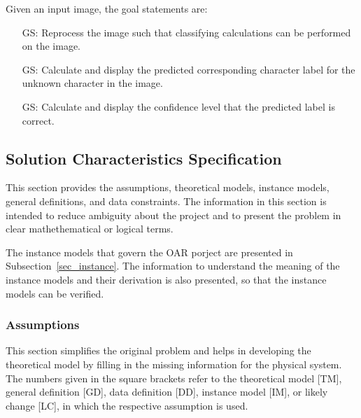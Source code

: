 \documentclass[12pt]{article}
\newcounter{goalnum} %
\begin{document}
\noindent Given an input image, the goal statements are:

\begin{itemize}

\item[GS\refstepcounter{goalnum}\thegoalnum \label{GS1}:] Reprocess the image such that classifying
calculations can be performed on the image.

\item[GS\refstepcounter{goalnum}\thegoalnum \label{GS2}:] Calculate and display the predicted 
corresponding character label for the unknown character in the image.

 \item[GS\refstepcounter{goalnum}\thegoalnum \label{GS3}:] Calculate and display the confidence level that
 the predicted label is correct.

\end{itemize}

\subsection{Solution Characteristics Specification}

This section provides the assumptions, theoretical models, instance models, general definitions,
and data constraints. The information in this section is intended to reduce ambiguity about the project and 
to present the problem in clear mathethematical or logical terms.

The instance models that govern the OAR porject are presented in
Subsection~\ref{sec_instance}.  The information to understand the meaning of the
instance models and their derivation is also presented, so that the instance
models can be verified.

\subsubsection{Assumptions} \label{sec_assumpt}


This section simplifies the original problem and helps in developing the
theoretical model by filling in the missing information for the physical system.
The numbers given in the square brackets refer to the theoretical model [TM],
general definition [GD], data definition [DD], instance model [IM], or likely
change [LC], in which the respective assumption is used.
\end{document}
